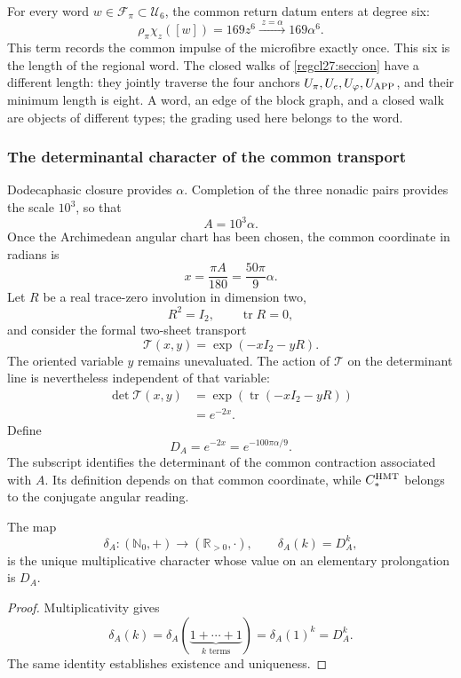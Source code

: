 For every word \(w\in\mathcal F_\pi\subset\mathcal U_6\), the common
return datum enters at degree six:
\[
\rho_\pi\chi_z([w])=169z^6
\xrightarrow{\;z=\alpha\;}169\alpha^6.
\]
This term records the common impulse of the microfibre exactly once.
This six is the length of the regional word. The closed walks of
\cref{regcl27:seccion} have a different length: they jointly traverse the
four anchors
\(U_\pi,U_e,U_\varphi,U_{\rm APP}\), and their minimum length is eight.
A word, an edge of the block graph, and a closed walk are objects of
different types; the grading used here belongs to the word.

\subsubsection{The determinantal character of the common transport}

Dodecaphasic closure provides \(\alpha\). Completion of the three nonadic
pairs provides the scale \(10^3\), so that
\[
A=10^3\alpha.
\]
Once the Archimedean angular chart has been chosen, the common coordinate
in radians is
\[
x=\frac{\pi A}{180}=\frac{50\pi}{9}\alpha.
\]
Let \(R\) be a real trace-zero involution in dimension two,
\[
R^2=I_2,
\qquad
\operatorname{tr}R=0,
\]
and consider the formal two-sheet transport
\[
\mathcal T(x,y)=\exp(-xI_2-yR).
\]
The oriented variable \(y\) remains unevaluated. The action of
\(\mathcal T\) on the determinant line is nevertheless independent of
that variable:
\[
\begin{aligned}
\det\mathcal T(x,y)
&=\exp\!\left(\operatorname{tr}(-xI_2-yR)\right)\\
&=e^{-2x}.
\end{aligned}
\]
Define
\[
\boxed{
D_A=e^{-2x}=e^{-100\pi\alpha/9}.}
\]
The subscript identifies the determinant of the common contraction
associated with \(A\). Its definition depends on that common coordinate,
while \(C_*^{\rm HMT}\) belongs to the conjugate angular reading.

\begin{proposition}
\label{p12-83-c13-s3:prop:caracter-determinante}
The map
\[
\delta_A:(\mathbb N_0,+)\longrightarrow(\mathbb R_{>0},\cdot),
\qquad
\delta_A(k)=D_A^k,
\]
is the unique multiplicative character whose value on an elementary
prolongation is \(D_A\).
\end{proposition}

\begin{proof}
Multiplicativity gives
\[
\delta_A(k)
=\delta_A(\underbrace{1+\cdots+1}_{k\text{ terms}})
=\delta_A(1)^k=D_A^k.
\]
The same identity establishes existence and uniqueness.
\end{proof}

